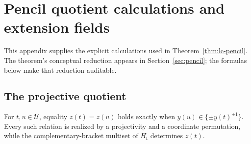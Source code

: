 \section{Pencil quotient calculations and extension fields}
\label{sec:pencil-calculations}

This appendix supplies the explicit calculations used in
Theorem~\ref{thm:lc-pencil}.  The theorem's conceptual reduction appears in
Section~\ref{sec:pencil}; the formulas below make that reduction auditable.

\subsection{The projective quotient}

\begin{proposition}
\label{prop:pencil-projective-recovery}
For \(t,u\in\mathcal U\), equality \(z(t)=z(u)\) holds exactly when
\(y(u)\in\{\pm y(t)^{\pm1}\}\).  Every such relation is realized by a
projectivity and a coordinate permutation, while the complementary-bracket
multiset of \(H_t\) determines \(z(t)\).
\end{proposition}

